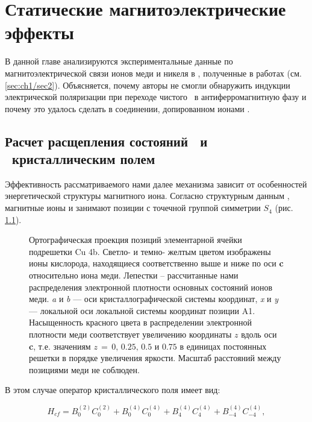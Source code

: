 \chapter{Статические магнитоэлектрические эффекты}\label{ch:ch2}

В данной главе анализируются экспериментальные данные по магнитоэлектрической связи ионов меди и никеля в \ncbo, полученные в работах \cite{Nenert2007, Khan2013} (см. \cref{sec:ch1/sec2}). Объясняется, почему авторы \cite{Nenert2007} не смогли обнаружить индукции электрической поляризации при переходе чистого \cbo\ в антиферромагнитную фазу и почему это удалось сделать в соединении, допированном ионами \niIon.

\section{Расчет расщепления состояний \cud\ и \nif\ кристаллическим полем}\label{sec:ch2/sec1}

Эффективность рассматриваемого нами далее механизма зависит от особенностей энергетической структуры магнитного иона. Согласно структурным данным \cite{Martinez1971}, магнитные ионы \niIon и \cu занимают позиции с точечной группой симметрии \(S_4\) (рис. \cref{fig:cu_distributions}).

\begin{figure}[ht]
    \caption{Ортографическая проекция позиций элементарной ячейки подрешетки Cu 4b. Светло- и темно- желтым цветом изображены ионы кислорода, находящиеся соответственно выше и ниже по оси \textbf{c} относительно иона меди. Лепестки – рассчитанные нами распределения электронной плотности основных состояний ионов меди. \textit{a} и \textit{b} --- оси кристаллографической системы координат, \textit{x} и \textit{y} --- локальной оси локальной системы координат позиции A1. Насыщенность красного цвета в распределении электронной плотности меди соответствует увеличению координаты $z$ вдоль оси \textbf{c}, т.е. значениям $z\,{=}\,0,\,0.25,\,0.5 \text{ и } 0.75$ в единицах постоянных решетки в порядке увеличения яркости. Масштаб расстояний между позициями меди не соблюден.}\label{fig:cu_distributions}
\end{figure}

В этом случае оператор кристаллического поля имеет вид:

\begin{equation}
	\label{eq:Hcf}
	H_{cf}=B_{0}^{(2)}C_{0}^{(2)}+B_{0}^{(4)}C_{0}^{(4)}+B_{4}^{(4)}C_{4}^{(4)}+B_{-4}^{(4)}C_{-4}^{(4)},
\end{equation}

